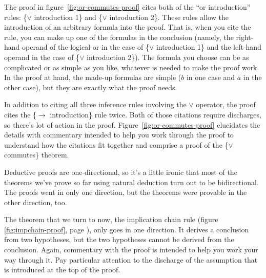{The proof in figure~\ref{fig:or-commutes-proof} cites both of the
``or introduction'' rules:
\{$\vee$ introduction 1\} and \{$\vee$ introduction 2\}.
These rules allow the introduction of an arbitrary formula
into the proof.
That is, when you cite the rule, you can make up one of the
formulas in the conclusion (namely, the right-hand operand of
the logical-or in the case of \{$\vee$ introduction 1\}
and the left-hand operand in the case of \{$\vee$ introduction 2\}).
The formula you choose can be as complicated or as simple as you like,
whatever is needed to make the proof work.
In the proof at hand,
the made-up formulas are simple ($b$ in one case and $a$ in the other case),
but they are exactly what the proof needs.

In addition to citing all three inference rules involving the $\vee$ operator,
the proof cites the \{$\rightarrow$ introduction\} rule twice.
Both of those citations require discharges,
so there's lot of action in the proof.
Figure~\ref{fig:or-commutes-proof}
elucidates the details with commentary
intended to help you work through the proof
to understand how the citations fit together and
comprise a proof of the \{$\vee$ commutes\} theorem.

Deductive proofs are one-directional,
so it's a little ironic that most
of the theorems we've prove so far using natural deduction
turn out to be bidirectional.
The proofs went in only one direction,
but the theorems were provable in the other direction, too.

The theorem that we turn to now, the implication chain rule
(figure \ref{fig:impchain-proof}, page \pageref{fig:impchain-proof}),
only goes in one direction.
It derives a conclusion from two hypotheses,
but the two hypotheses cannot be derived from the conclusion.
Again, commentary with the proof is intended
to help you work your way through it.
Pay particular attention to the discharge of the
assumption that is introduced at the top of the proof.

}
